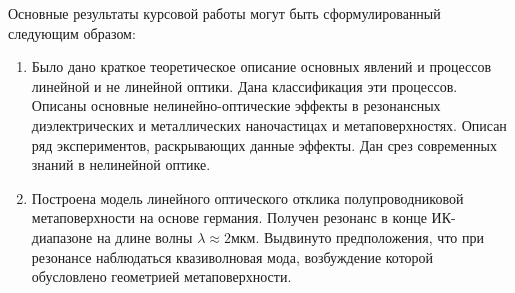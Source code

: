 

Основные результаты курсовой работы могут быть сформулированный следующим образом:
\begin{enumerate}
\item Было дано краткое теоретическое описание основных явлений и процессов линейной и не линейной оптики. Дана классификация эти процессов. Описаны основные нелинейно-оптические эффекты в резонансных диэлектрических и металлических наночастицах и метаповерхностях. Описан ряд экспериментов, раскрывающих данные эффекты.  Дан срез современных знаний в нелинейной оптике. 
\item Построена модель линейного оптического отклика полупроводниковой метаповерхности на основе германия.  Получен резонанс  в  конце ИК-диапазоне на длине волны $ \lambda \approx  2$мкм. Выдвинуто предположения,  что при резонансе наблюдаться квазиволновая мода, возбуждение которой обусловлено геометрией метаповерхности.  
\end{enumerate}
